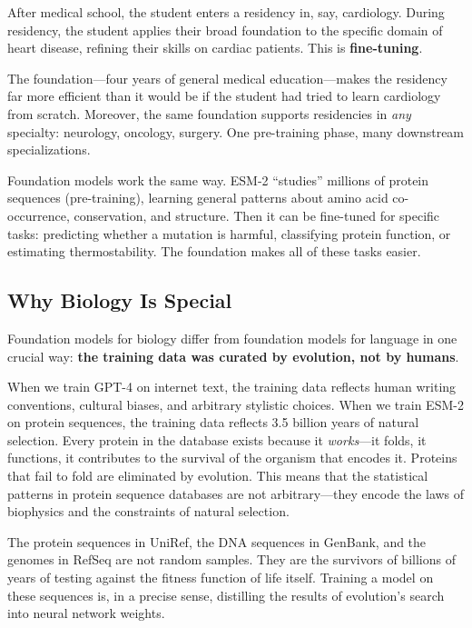 After medical school, the student enters a residency in, say, cardiology. During residency, the student applies their broad foundation to the specific domain of heart disease, refining their skills on cardiac patients. This is \textbf{fine-tuning}.

The foundation---four years of general medical education---makes the residency far more efficient than it would be if the student had tried to learn cardiology from scratch. Moreover, the same foundation supports residencies in \emph{any} specialty: neurology, oncology, surgery. One pre-training phase, many downstream specializations.

Foundation models work the same way. ESM-2 ``studies'' millions of protein sequences (pre-training), learning general patterns about amino acid co-occurrence, conservation, and structure. Then it can be fine-tuned for specific tasks: predicting whether a mutation is harmful, classifying protein function, or estimating thermostability. The foundation makes all of these tasks easier.

\subsection{Why Biology Is Special}

Foundation models for biology differ from foundation models for language in one crucial way: \textbf{the training data was curated by evolution, not by humans}.

When we train GPT-4 on internet text, the training data reflects human writing conventions, cultural biases, and arbitrary stylistic choices. When we train ESM-2 on protein sequences, the training data reflects 3.5 billion years of natural selection. Every protein in the database exists because it \emph{works}---it folds, it functions, it contributes to the survival of the organism that encodes it. Proteins that fail to fold are eliminated by evolution. This means that the statistical patterns in protein sequence databases are not arbitrary---they encode the laws of biophysics and the constraints of natural selection.

\begin{bioinsight}
The protein sequences in UniRef, the DNA sequences in GenBank, and the genomes in RefSeq are not random samples. They are the survivors of billions of years of testing against the fitness function of life itself. Training a model on these sequences is, in a precise sense, distilling the results of evolution's search into neural network weights.
\end{bioinsight}

